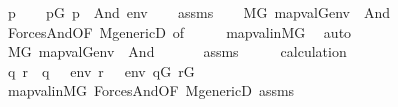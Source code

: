 \begin{isabellebody}
\ p\isanewline
\ \ \isamarkupfalse%
\ {\isachardoublequoteopen}p{\isasymin}G{\isachardoublequoteclose}\ {\isachardoublequoteopen}p\ {\isasymtturnstile}\ And{\isacharparenleft}{\kern0pt}{\isasymphi}{\isacharcomma}{\kern0pt}{\isasympsi}{\isacharparenright}{\kern0pt}\ env{\isachardoublequoteclose}\isanewline
\ \ \isamarkupfalse%
\ assms\isanewline
\ \ \isamarkupfalse%
\ {\isachardoublequoteopen}M{\isacharbrackleft}{\kern0pt}G{\isacharbrackright}{\kern0pt}{\isacharcomma}{\kern0pt}\ map{\isacharparenleft}{\kern0pt}val{\isacharparenleft}{\kern0pt}G{\isacharparenright}{\kern0pt}{\isacharcomma}{\kern0pt}env{\isacharparenright}{\kern0pt}\ {\isasymTurnstile}\ And{\isacharparenleft}{\kern0pt}{\isasymphi}{\isacharcomma}{\kern0pt}{\isasympsi}{\isacharparenright}{\kern0pt}{\isachardoublequoteclose}\ \isanewline
\ \ \ \ \isamarkupfalse%
\ Forces{\isacharunderscore}{\kern0pt}And{\isacharbrackleft}{\kern0pt}OF\ M{\isacharunderscore}{\kern0pt}genericD{\isacharcomma}{\kern0pt}\ of\ {\isacharunderscore}{\kern0pt}\ {\isacharunderscore}{\kern0pt}\ {\isacharunderscore}{\kern0pt}\ {\isasymphi}\ {\isasympsi}{\isacharbrackright}{\kern0pt}\ map{\isacharunderscore}{\kern0pt}val{\isacharunderscore}{\kern0pt}in{\isacharunderscore}{\kern0pt}MG\ \isamarkupfalse%
\ auto\isanewline
{}\isamarkupfalse%
\ \isanewline
\ \ \isamarkupfalse%
\ {\isachardoublequoteopen}M{\isacharbrackleft}{\kern0pt}G{\isacharbrackright}{\kern0pt}{\isacharcomma}{\kern0pt}\ map{\isacharparenleft}{\kern0pt}val{\isacharparenleft}{\kern0pt}G{\isacharparenright}{\kern0pt}{\isacharcomma}{\kern0pt}env{\isacharparenright}{\kern0pt}\ {\isasymTurnstile}\ And{\isacharparenleft}{\kern0pt}{\isasymphi}{\isacharcomma}{\kern0pt}{\isasympsi}{\isacharparenright}{\kern0pt}{\isachardoublequoteclose}\isanewline
\ \ \isamarkupfalse%
\isanewline
\ \ \isamarkupfalse%
\ assms\isanewline
\ \ \isamarkupfalse%
\ \isamarkupfalse%
\ calculation\isanewline
\ \ \isamarkupfalse%
\ q\ r\ \ {\isachardoublequoteopen}q\ {\isasymtturnstile}\ {\isasymphi}\ env{\isachardoublequoteclose}\ {\isachardoublequoteopen}r\ {\isasymtturnstile}\ {\isasympsi}\ env{\isachardoublequoteclose}\ {\isachardoublequoteopen}q{\isasymin}G{\isachardoublequoteclose}\ {\isachardoublequoteopen}r{\isasymin}G{\isachardoublequoteclose}\isanewline
\ \ \ \ \isamarkupfalse%
\ map{\isacharunderscore}{\kern0pt}val{\isacharunderscore}{\kern0pt}in{\isacharunderscore}{\kern0pt}MG\ Forces{\isacharunderscore}{\kern0pt}And{\isacharbrackleft}{\kern0pt}OF\ M{\isacharunderscore}{\kern0pt}genericD\ assms{\isacharparenleft}{\kern0pt}{}{\isacharminus}{\kern0pt}{}{\isacharparenright}{\kern0pt}{\isacharbrackright}{\kern0pt}\ \isamarkupfalse%

\end{isabellebody}
